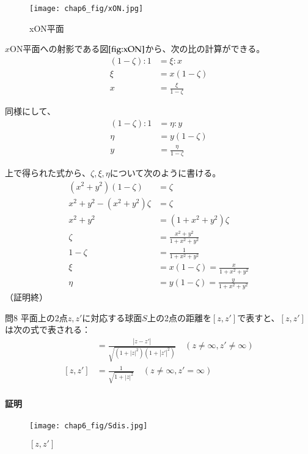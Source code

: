 \begin{figure}[h]
    \centering
    \texttt{[image: chap6\_fig/xON.jpg]}
    \caption{xON平面}
    \label{fig:xON}
\end{figure}

$x$ON平面への射影である図$\ref{fig:xON}$から、次の比の計算ができる。
\begin{align*}
    (1-\zeta):1&=\xi:x\\
    \xi&=x(1-\zeta)\\
    x&=\frac{\xi}{1-\zeta}
\end{align*}

同様にして、
\begin{align*}
    (1-\zeta):1&=\eta:y\\
    \eta&=y(1-\zeta)\\
    y&=\frac{\eta}{1-\zeta}
\end{align*}

上で得られた式から、$\zeta,\xi,\eta$について次のように書ける。
\begin{align*}
    (x^2+y^2)(1-\zeta)&=\zeta\\
    x^2+y^2-(x^2+y^2)\zeta&=\zeta\\
    x^2+y^2&=(1+x^2+y^2)\zeta\\
    \zeta&=\frac{x^2+y^2}{1+x^2+y^2}\\
    1-\zeta&=\frac{1}{1+x^2+y^2}\\
    \xi&=x(1-\zeta)=\frac{x}{1+x^2+y^2}\\
    \eta&=y(1-\zeta)=\frac{y}{1+x^2+y^2}
\end{align*}
（証明終）
\newpage
\begin{mysimplebox}{問8}
    平面上の2点$z,z'$に対応する球面$S$上の2点の距離を$[z,z']$で表すと、$[z,z']$は次の式で表される：
    \begin{align*}
        [z,z']&=\frac{|z-z'|}{\sqrt{(1+|z|^2)(1+|z'|^2)}}
        \quad(z\neq\infty,z'\neq\infty)\\
        [z,z']&=\frac{1}{\sqrt{1+|z|^2}}
        \quad(z\neq\infty,z'=\infty)
    \end{align*}
\end{mysimplebox}
\paragraph{証明}

\begin{figure}[h]
    \centering
    \texttt{[image: chap6\_fig/Sdis.jpg]}
    \caption{$[z,z']$}
    \label{fig:Sdis}
\end{figure}

